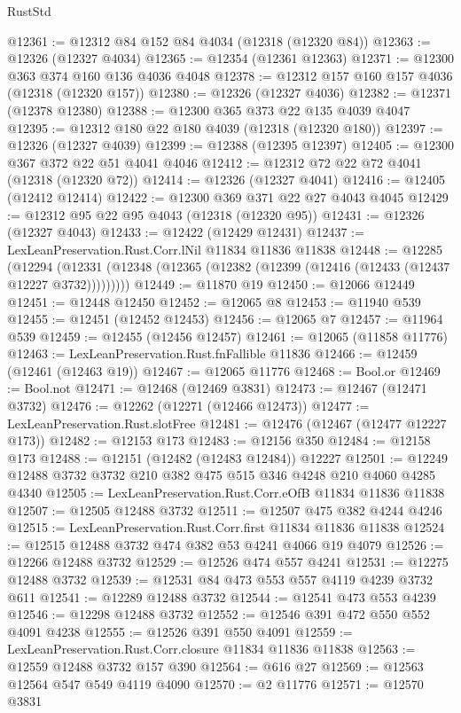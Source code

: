 \begin{lexlean}{RustStd}
\begin{coremodule}
@12361 := @12312 @84 @152 @84 @4034 (@12318 (@12320 @84))
@12363 := @12326 (@12327 @4034)
@12365 := @12354 (@12361 @12363)
@12371 := @12300 @363 @374 @160 @136 @4036 @4048
@12378 := @12312 @157 @160 @157 @4036 (@12318 (@12320 @157))
@12380 := @12326 (@12327 @4036)
@12382 := @12371 (@12378 @12380)
@12388 := @12300 @365 @373 @22 @135 @4039 @4047
@12395 := @12312 @180 @22 @180 @4039 (@12318 (@12320 @180))
@12397 := @12326 (@12327 @4039)
@12399 := @12388 (@12395 @12397)
@12405 := @12300 @367 @372 @22 @51 @4041 @4046
@12412 := @12312 @72 @22 @72 @4041 (@12318 (@12320 @72))
@12414 := @12326 (@12327 @4041)
@12416 := @12405 (@12412 @12414)
@12422 := @12300 @369 @371 @22 @27 @4043 @4045
@12429 := @12312 @95 @22 @95 @4043 (@12318 (@12320 @95))
@12431 := @12326 (@12327 @4043)
@12433 := @12422 (@12429 @12431)
@12437 := LexLeanPreservation.Rust.Corr.lNil @11834 @11836 @11838
@12448 := @12285
    (@12294 (@12331 (@12348 (@12365 (@12382 (@12399 (@12416 (@12433 (@12437 @12227 @3732)))))))))
@12449 := @11870 @19
@12450 := @12066 @12449
@12451 := @12448 @12450
@12452 := @12065 @8
@12453 := @11940 @539
@12455 := @12451 (@12452 @12453)
@12456 := @12065 @7
@12457 := @11964 @539
@12459 := @12455 (@12456 @12457)
@12461 := @12065 (@11858 @11776)
@12463 := LexLeanPreservation.Rust.fnFallible @11836
@12466 := @12459 (@12461 (@12463 @19))
@12467 := @12065 @11776
@12468 := Bool.or
@12469 := Bool.not
@12471 := @12468 (@12469 @3831)
@12473 := @12467 (@12471 @3732)
@12476 := @12262 (@12271 (@12466 @12473))
@12477 := LexLeanPreservation.Rust.slotFree
@12481 := @12476 (@12467 (@12477 @12227 @173))
@12482 := @12153 @173
@12483 := @12156 @350
@12484 := @12158 @173
@12488 := @12151 (@12482 (@12483 @12484)) @12227
@12501 := @12249 @12488 @3732 @3732 @210 @382 @475 @515 @346 @4248 @210 @4060 @4285 @4340
@12505 := LexLeanPreservation.Rust.Corr.eOfB @11834 @11836 @11838
@12507 := @12505 @12488 @3732
@12511 := @12507 @475 @382 @4244 @4246
@12515 := LexLeanPreservation.Rust.Corr.first @11834 @11836 @11838
@12524 := @12515 @12488 @3732 @474 @382 @53 @4241 @4066 @19 @4079
@12526 := @12266 @12488 @3732
@12529 := @12526 @474 @557 @4241
@12531 := @12275 @12488 @3732
@12539 := @12531 @84 @473 @553 @557 @4119 @4239 @3732 @611
@12541 := @12289 @12488 @3732
@12544 := @12541 @473 @553 @4239
@12546 := @12298 @12488 @3732
@12552 := @12546 @391 @472 @550 @552 @4091 @4238
@12555 := @12526 @391 @550 @4091
@12559 := LexLeanPreservation.Rust.Corr.closure @11834 @11836 @11838
@12563 := @12559 @12488 @3732 @157 @390
@12564 := @616 @27
@12569 := @12563 @12564 @547 @549 @4119 @4090
@12570 := @2 @11776
@12571 := @12570 @3831

\end{coremodule}
\end{lexlean}
